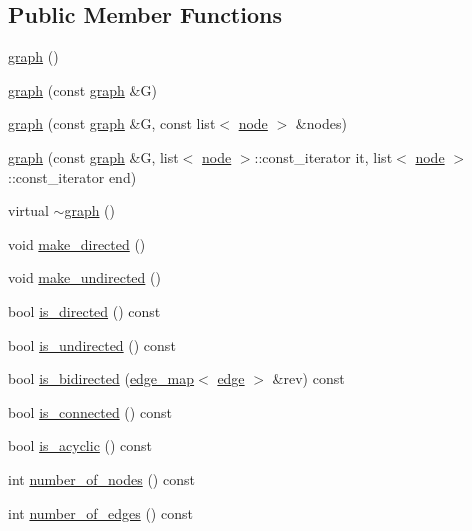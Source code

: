 \subsection*{Public Member Functions}
\begin{DoxyCompactItemize}
\item 
\mbox{\hyperlink{classgraph_a902c372b9d1835d07e0c62248b859356}{graph}} ()
\item 
\mbox{\hyperlink{classgraph_a4339b04667a9977110e59a1326b0e2d5}{graph}} (const \mbox{\hyperlink{classgraph}{graph}} \&G)
\item 
\mbox{\hyperlink{classgraph_a739d58ba54344d5107e7841e34d01243}{graph}} (const \mbox{\hyperlink{classgraph}{graph}} \&G, const list$<$ \mbox{\hyperlink{classnode}{node}} $>$ \&nodes)
\item 
\mbox{\hyperlink{classgraph_aa10c09b6e5c7f6f98432d1c454aefe89}{graph}} (const \mbox{\hyperlink{classgraph}{graph}} \&G, list$<$ \mbox{\hyperlink{classnode}{node}} $>$\+::const\+\_\+iterator it, list$<$ \mbox{\hyperlink{classnode}{node}} $>$\+::const\+\_\+iterator end)
\item 
virtual \mbox{\hyperlink{classgraph_aeb62eaf197cdcb4800fa016eebc3d55a}{$\sim$graph}} ()
\item 
void \mbox{\hyperlink{classgraph_a1615678dee6248d6d8a00c553770b3bd}{make\+\_\+directed}} ()
\item 
void \mbox{\hyperlink{classgraph_a31c8b895bd842f1b9dcc67649956cfc7}{make\+\_\+undirected}} ()
\item 
bool \mbox{\hyperlink{classgraph_afc510be7479fa903fde9e0e615470ab0}{is\+\_\+directed}} () const
\item 
bool \mbox{\hyperlink{classgraph_aba427ff8ba0f70c68416ec1351344cd8}{is\+\_\+undirected}} () const
\item 
bool \mbox{\hyperlink{classgraph_a8014a8073dd640c91cbd4fc1fb6e6071}{is\+\_\+bidirected}} (\mbox{\hyperlink{classedge__map}{edge\+\_\+map}}$<$ \mbox{\hyperlink{classedge}{edge}} $>$ \&rev) const
\item 
bool \mbox{\hyperlink{classgraph_a599e2bf967df8a2052a9892c94db98b7}{is\+\_\+connected}} () const
\item 
bool \mbox{\hyperlink{classgraph_a9b500cb72826fe5bbefa8c71bc4642fa}{is\+\_\+acyclic}} () const
\item 
int \mbox{\hyperlink{classgraph_a42c78e0a9f115655e3ff0efe35ebfc4e}{number\+\_\+of\+\_\+nodes}} () const
\item 
int \mbox{\hyperlink{classgraph_aa4fcbe7bf572dc800068873ccfb4d95a}{number\+\_\+of\+\_\+edges}} () const

\end{DoxyCompactItemize}
